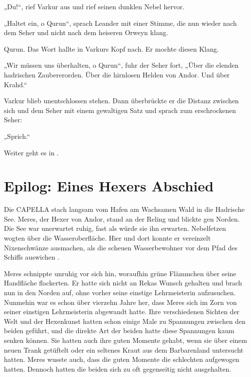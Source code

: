 „Du!“, rief Varkur aus und rief seinen dunklen Nebel hervor.

„Haltet ein, o Qurun“, sprach Leander mit einer Stimme, die nun wieder nach dem Seher und nicht nach dem heiseren Orweyn klang.

Qurun. Das Wort hallte in Varkurs Kopf nach. Er mochte diesen Klang.

„Wir müssen uns überhalten, o Qurun“, fuhr der Seher fort, „Über die elenden hadrischen Zaubererorden. Über die hirnlosen Helden von Andor. Und über Krahd.“

Varkur blieb unentschlossen stehen. Dann überbrückte er die Distanz zwischen sich und dem Seher mit einem gewaltigen Satz und sprach zum erschrockenen Seher:

„Sprich.“

\begin{center}
    Weiter geht es in .
\end{center}












\newpage
\section{Epilog: Eines Hexers Abschied}



Die CAPELLA stach langsam vom Hafen am Wachsamen Wald in die Hadrische See. Meres, der Hexer von Andor, stand an der Reling und blickte gen Norden. Die See war unerwartet ruhig, fast als würde sie ihn erwarten. Nebelfetzen wogten über die Wasseroberfläche. Hier und dort konnte er vereinzelt Nixenschwänze ausmachen, als die scheuen Wasserbewohner vor dem Pfad des Schiffs auswichen .

Meres schnippte unruhig vor sich hin, woraufhin grüne Flämmchen über seine Handfläche flackerten. Er hatte sich nicht an Rekas Wunsch gehalten und brach nun in den Norden auf, ohne vorher seine einstige Lehrmeisterin aufzusuchen. Nunmehin war es schon über vierzehn Jahre her, dass Meres sich im Zorn von seiner einstigen Lehrmeisterin abgewandt hatte. Ihre verschiedenen Sichten der Welt und der Hexenkunst hatten schon einige Male zu Spannungen zwischen den beiden geführt, und die direkte Art der beiden hatte diese Spannungen kaum senken können. Sie hatten auch ihre guten Momente gehabt, wenn sie über einem neuen Trank getüftelt oder ein seltenes Kraut aus dem Barbarenland untersucht hatten. Meres wusste auch, dass die guten Momente die schlechten aufgewogen hatten. Dennoch hatten die beiden sich zu oft gegenseitig nicht ausgehalten.

